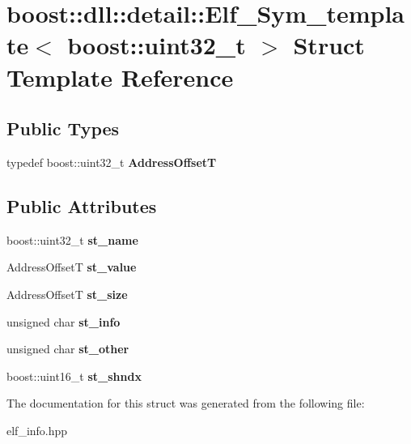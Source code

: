 \hypertarget{a01400}{}\section{boost\+:\+:dll\+:\+:detail\+:\+:Elf\+\_\+\+Sym\+\_\+template$<$ boost\+:\+:uint32\+\_\+t $>$ Struct Template Reference}
\label{a01400}
\subsection*{Public Types}
\begin{DoxyCompactItemize}
\item 
\mbox{\label{a01400_a5d357c24b88c12797825ae9aac2ad518}} 
typedef boost\+::uint32\+\_\+t {\bfseries Address\+OffsetT}
\end{DoxyCompactItemize}
\subsection*{Public Attributes}
\begin{DoxyCompactItemize}
\item 
\mbox{\label{a01400_a5f05cce584bc27a780fe9d1526c819c3}} 
boost\+::uint32\+\_\+t {\bfseries st\+\_\+name}
\item 
\mbox{\label{a01400_a22d87bb002a00dfaf68e38618b08e972}} 
Address\+OffsetT {\bfseries st\+\_\+value}
\item 
\mbox{\label{a01400_a8ad90ebe03f73b3d89493d5d454fffdf}} 
Address\+OffsetT {\bfseries st\+\_\+size}
\item 
\mbox{\label{a01400_a4c025e263be3687bc20e584ec187786c}} 
unsigned char {\bfseries st\+\_\+info}
\item 
\mbox{\label{a01400_ac583a35bd53e3e45c0da77d2b7de504f}} 
unsigned char {\bfseries st\+\_\+other}
\item 
\mbox{\label{a01400_ac782cc2b5aac3204a6553d3534e112dd}} 
boost\+::uint16\+\_\+t {\bfseries st\+\_\+shndx}
\end{DoxyCompactItemize}


The documentation for this struct was generated from the following file\+:\begin{DoxyCompactItemize}
\item 
elf\+\_\+info.\+hpp\end{DoxyCompactItemize}
